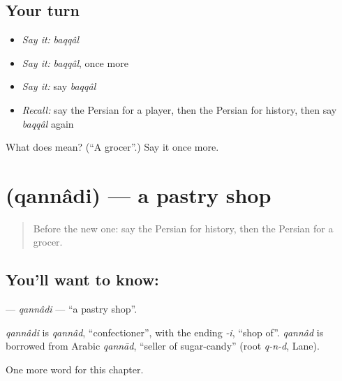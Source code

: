 \subsection*{Your turn}
\begin{itemize}
\raggedright
  \item \emph{Say it:} \emph{baqqâl}
  \item \emph{Say it:} \emph{baqqâl}, once more
  \item \emph{Say it:} say \emph{baqqâl}
  \item \emph{Recall:} say the Persian for a player, then the Persian for history, then say \emph{baqqâl} again
\end{itemize}

\begin{tcolorbox}[breakable,colback=teal!4,colframe=teal!35!black,title={Before you move on}]
What does  mean? (\textquotedblleft{}A grocer\textquotedblright{}.) Say it once more.
\end{tcolorbox}
\section[\texorpdfstring{\fa{قنادی} (qannâdi)}{قنادی (qannâdi)}]{ (qannâdi) — a pastry shop}

\label{lesson:FA-C252-qannadi}



\begin{quote}
Before the new one: say the Persian for history, then the Persian for a grocer.
\end{quote}

\subsection*{You'll want to know: }
\textbf{} — \emph{qannâdi} — \textquotedblleft{}a pastry shop\textquotedblright{}.

\begin{cousinweb}
\emph{qannâdi} is \emph{qannâd}, \textquotedblleft{}confectioner\textquotedblright{}, with the ending \emph{-i}, \textquotedblleft{}shop of\textquotedblright{}. \emph{qannâd} is borrowed from Arabic \emph{qannād}, \textquotedblleft{}seller of sugar-candy\textquotedblright{} (root \emph{q-n-d}, Lane).
\end{cousinweb}

\begin{grammarlens}[title={What you've built}]
One more word for this chapter.
\end{grammarlens}

